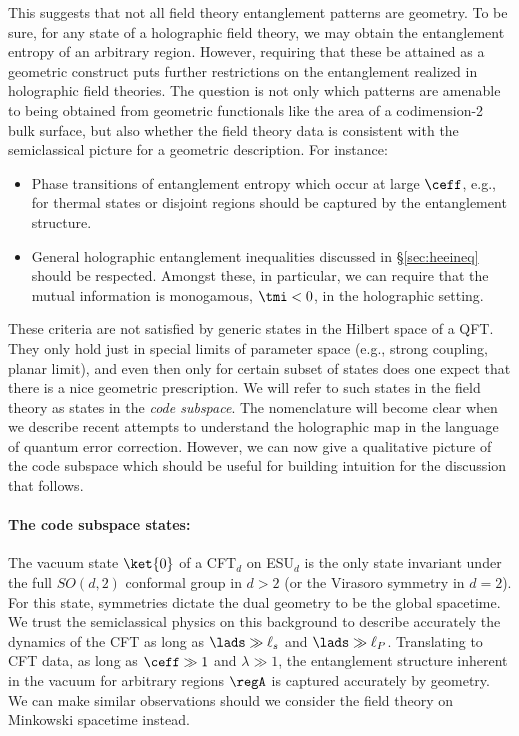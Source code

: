 \documentclass[12pt,openany]{book}
\begin{document}
This suggests that not all field theory entanglement patterns are geometry. To be sure, for any state of a holographic field theory, we may obtain the entanglement entropy of an arbitrary region. However, requiring that these be attained as a geometric construct puts further restrictions on the entanglement realized in holographic field theories. The question is not only which patterns are amenable to being obtained from geometric functionals like the area of a codimension-2 bulk surface, but also whether the field theory data is consistent with the semiclassical picture for a geometric description. For instance:
\begin{itemize}
\item Phase transitions of entanglement entropy  which occur at large $\ceff$, e.g., for thermal states or disjoint regions should be captured by the entanglement structure.
\item General holographic entanglement inequalities discussed in \S\ref{sec:heeineq} should be respected. Amongst these, in particular, we can require that the mutual information is monogamous,  $\tmi <0 $, in the holographic setting.
\end{itemize}

These criteria are not satisfied by generic states in the Hilbert space of a QFT. They only hold just in special limits of parameter space (e.g., strong coupling, planar limit), and even then only for certain subset of states does one expect that there is a nice geometric prescription.  We will refer to such states in the field theory as states in the {\em code subspace}. The nomenclature will become clear when we describe recent attempts to understand the holographic map in the language of quantum error correction. However, we can now give a qualitative picture of the code subspace which should be useful for building intuition for the discussion that follows.

\paragraph{The code subspace states:}
The vacuum state $\ket{0}$ of a CFT$_d$ on ESU$_d$ is the only state invariant under the full  $SO(d,2)$ conformal group in $d >2 $ (or the Virasoro symmetry in $d=2$).  For this state, symmetries dictate the dual geometry to be the  global  spacetime.  We trust the semiclassical physics on this background to describe accurately the dynamics of the CFT as long as  $\lads \gg \ell_s $ and $\lads \gg \ell_P$. Translating to CFT data, as long as $\ceff\gg1$ and $\lambda\gg 1$, the entanglement structure inherent in the vacuum for arbitrary regions $\regA$ is captured accurately by geometry. We can make similar observations should we consider the field theory on Minkowski spacetime instead.
\end{document}

